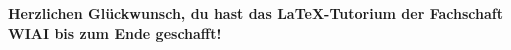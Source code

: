 




\setcounter{page}{2}
\tableofcontents
\newpage
\listoffigures
\newpage
\listoftables
\newpage
\setcounter{page}{1}

\newpage

\newpage


\textbf{Herzlichen Glückwunsch, du hast das \LaTeX -Tutorium der Fachschaft WIAI bis zum Ende geschafft!}


